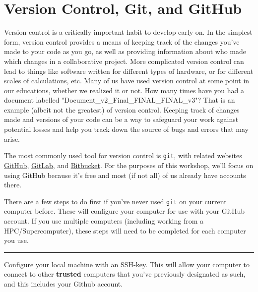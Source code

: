 \section{Version Control, Git, and GitHub}
Version control is a critically important habit to develop early on.
In the simplest form, version control provides a means of keeping track of the changes you've made to your code as you go, as well as providing information about who made which changes in a collaborative project.
More complicated version control can lead to things like software written for different types of hardware, or for different scales of calculations, etc.
Many of us have used version control at some point in our educations, whether we realized it or not.
How many times have you had a document labelled "Document\_v2\_Final\_FINAL\_FINAL\_v3"?
That is an example (albeit not the greatest) of version control.
Keeping track of changes made and versions of your code can be a way to safeguard your work against potential losses and help you track down the source of bugs and errors that may arise.

The most commonly used tool for version control is \texttt{git}, with related websites \href{https://www.github.com}{GitHub}, \href{https://about.gitlab.com/}{GitLab}, and \href{https://bitbucket.org/}{Bitbucket}. 
For the purposes of this workshop, we'll focus on using GitHub because it's free and most (if not all) of us already have accounts there.

There are a few steps to do first if you've never used \texttt{git} on your current computer before. 
These will configure your computer for use with your GitHub account. 
If you use multiple computers (including working from a HPC/Supercomputer), these steps will need to be completed for each computer you use.

\begin{center}\rule{0.5\linewidth}{0.5pt}\end{center}

Configure your local machine with an SSH-key. 
This will allow your computer to connect to other \textbf{trusted} computers that you've previously designated as such, and this includes your Github account.

\begin{Shaded}
\begin{Highlighting}[]
     
\end{Highlighting}
\end{Shaded}

